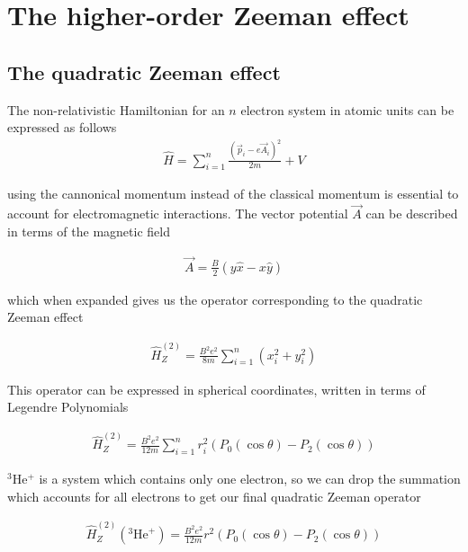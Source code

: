     \section{The higher-order Zeeman effect}\label{sec:Higher_Zeeman}
        \subsection{The quadratic Zeeman effect}\label{sec:quadratic_zeeman}
            The non-relativistic Hamiltonian for an $n$ electron system in atomic units can be expressed as follows
            \begin{align}
                \hat{H} = \sum_{i = 1}^n \frac{\left(\vec{p}_i - e\vec{A}_i \right)^2}{2m} + V
            \end{align}

            \noindent using the cannonical momentum instead of the classical momentum is essential to account for electromagnetic interactions. The vector potential $\vec{A}$ can be described in terms of the magnetic field

            \begin{align}
                \vec{A} = \frac{B}{2} \left( y\hat{x} - x\hat{y} \right)
            \end{align}

            \noindent which when expanded gives us the operator corresponding to the quadratic Zeeman effect

            \begin{align}
                \hat{H}_Z^{(2)} = \frac{B^2 e^2}{8m} \sum_{i = 1}^n (x_i^2 + y_i^2)
            \end{align}

            \noindent This operator can be expressed in spherical coordinates, written in terms of Legendre Polynomials

            \begin{align}
                \hat{H}^{(2)}_Z = \frac{B^2 e^2}{12m} \sum_{i = 1}^n r_i^2 \left( P_0(\cos \theta) - P_2(\cos \theta) \right)
            \end{align}

            \noindent $^3$He$^+$ is a system which contains only one electron, so we can drop the summation which accounts for all electrons to get our final quadratic Zeeman operator

            \begin{align}
                \hat{H}^{(2)}_Z(^3\text{He}^+) = \frac{B^2 e^2}{12m} r^2 \left( P_0(\cos \theta) - P_2(\cos \theta) \right)
            \end{align}

